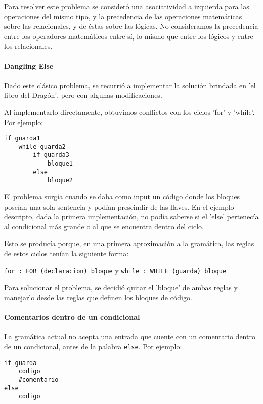 Para resolver este problema se consideró una asociatividad a izquierda para las operaciones del mismo tipo, y la precedencia de las operaciones matemáticas sobre las relacionales, y de éstas sobre las lógicas.  No consideramos la precedencia entre los operadores matemáticos entre sí, lo mismo que entre los lógicos y entre los relacionales.

\paragraph{Dangling Else}
Dado este clásico problema, se recurrió a implementar la solución brindada en 'el libro del Dragón', pero con algunas modificaciones.

Al implementarlo directamente, obtuvimos conflictos con los ciclos 'for' y 'while'.  Por ejemplo:

\begin{lstlisting}
if guarda1
	while guarda2
		if guarda3
			bloque1
		else
			bloque2	
\end{lstlisting}

El problema surgía cuando se daba como input un código donde los bloques poseían una sola sentencia y podían prescindir de las llaves.  En el ejemplo descripto, dada la primera implementación, no podía saberse si el 'else' pertenecía al condicional más grande o al que se encuentra dentro del ciclo.

Esto se producía porque, en una primera aproximación a la gramática, las reglas de estos ciclos tenían la siguiente forma:

{\tt for : FOR (declaracion) bloque} y {\tt while : WHILE (guarda) bloque}

Para solucionar el problema, se decidió quitar el 'bloque' de ambas reglas y manejarlo desde las reglas que definen los bloques de código. 

\paragraph{Comentarios dentro de un condicional}
La gramática actual no acepta una entrada que cuente con un comentario dentro de un condicional, antes de la palabra {\tt else}.  Por ejemplo: 

\begin{lstlisting}
if guarda
	codigo
	#comentario
else
	codigo
\end{lstlisting}